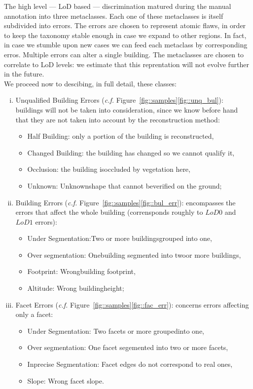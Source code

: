 \documentclass[../main.tex]{subfiles}
\begin{document}
    The high level --- LoD based --- discrimination matured during the manual annotation into three metaclasses. Each one of these metaclasses is itself subdivided into errors. The errors are chosen to represent atomic flaws, in order to keep the taxonomy stable enough in case we expand to other regions. In fact, in case we stumble upon new cases we can feed each metaclass by corresponding erros. Multiple errors can alter a single building. The metaclasses are chosen to correlate to LoD levels: we estimate that this reprentation will not evolve further in the future.\\

    We proceed now to descibing, in full detail, these classes:

    \begin{enumerate}[(i)]
        \item Unqualified Building Errors (\textit{c.f.} Figure~\ref{fig::samples}\ref{fig::unq_bul}): buildings will not be taken into consideration, since we know before hand that they are not taken into account by the reconstruction method:
        \begin{itemize}
            \item Half Building:  only a portion of the building is reconstructed,
            \item Changed Building:  the building has changed so we cannot qualify it,
            \item Occlusion:  the building isoccluded by vegetation here,
            \item Unknown:  Unknownshape that cannot beverified on the ground;
        \end{itemize}
        \item Building Errors (\textit{c.f.} Figure~\ref{fig::samples}\ref{fig::bul_err}): encompasses the errors that affect the whole building (corrensponds roughly to $LoD0$ and $LoD1$ errors):
        \begin{itemize}
            \item Under Segmentation:Two or more buildingsgrouped into one,
            \item Over segmentation:  Onebuilding segmented into twoor more buildings,
            \item Footprint:  Wrongbuilding footprint,
            \item Altitude:  Wrong buildingheight;
        \end{itemize}
        \item Facet Errors (\textit{c.f.} Figure~\ref{fig::samples}\ref{fig::fac_err}): concerns errors affecting only a facet:
        \begin{itemize}
            \item Under Segmentation: Two facets or more groupedinto one,
            \item Over segmentation: One facet segemented into two or more facets,
            \item Inprecise Segmentation: Facet edges do not correspond to real ones,
            \item Slope:  Wrong facet slope.
        \end{itemize}
    \end{enumerate}
\end{document}
